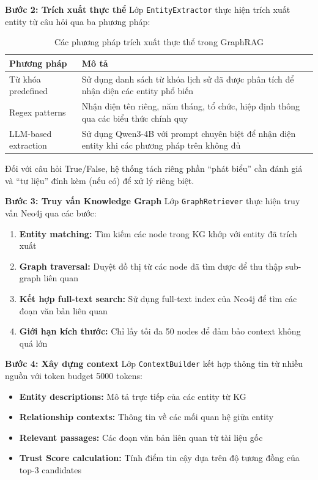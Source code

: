 \textbf{Bước 2: Trích xuất thực thể}
Lớp \texttt{EntityExtractor} thực hiện trích xuất entity từ câu hỏi qua ba phương pháp:

\begin{table}[H]
\centering
\caption{Các phương pháp trích xuất thực thể trong GraphRAG}
\label{tab:entity-extraction-methods}
\begin{tabular}{|l|p{9cm}|}
\hline
\textbf{Phương pháp} & \textbf{Mô tả} \\
\hline
Từ khóa predefined & Sử dụng danh sách từ khóa lịch sử đã được phân tích để nhận diện các entity phổ biến \\
\hline
Regex patterns & Nhận diện tên riêng, năm tháng, tổ chức, hiệp định thông qua các biểu thức chính quy \\
\hline
LLM-based extraction & Sử dụng Qwen3-4B với prompt chuyên biệt để nhận diện entity khi các phương pháp trên không đủ \\
\hline
\end{tabular}
\end{table}

Đối với câu hỏi True/False, hệ thống tách riêng phần ``phát biểu'' cần đánh giá và ``tư liệu'' đính kèm (nếu có) để xử lý riêng biệt.

\textbf{Bước 3: Truy vấn Knowledge Graph}
Lớp \texttt{GraphRetriever} thực hiện truy vấn Neo4j qua các bước:

\begin{enumerate}
    \item \textbf{Entity matching:} Tìm kiếm các node trong KG khớp với entity đã trích xuất
    \item \textbf{Graph traversal:} Duyệt đồ thị từ các node đã tìm được để thu thập sub-graph liên quan
    \item \textbf{Kết hợp full-text search:} Sử dụng full-text index của Neo4j để tìm các đoạn văn bản liên quan
    \item \textbf{Giới hạn kích thước:} Chỉ lấy tối đa 50 nodes để đảm bảo context không quá lớn
\end{enumerate}

\textbf{Bước 4: Xây dựng context}
Lớp \texttt{ContextBuilder} kết hợp thông tin từ nhiều nguồn với token budget 5000 tokens:

\begin{itemize}
    \item \textbf{Entity descriptions:} Mô tả trực tiếp của các entity từ KG
    \item \textbf{Relationship contexts:} Thông tin về các mối quan hệ giữa entity
    \item \textbf{Relevant passages:} Các đoạn văn bản liên quan từ tài liệu gốc
    \item \textbf{Trust Score calculation:} Tính điểm tin cậy dựa trên độ tương đồng của top-3 candidates
\end{itemize}

